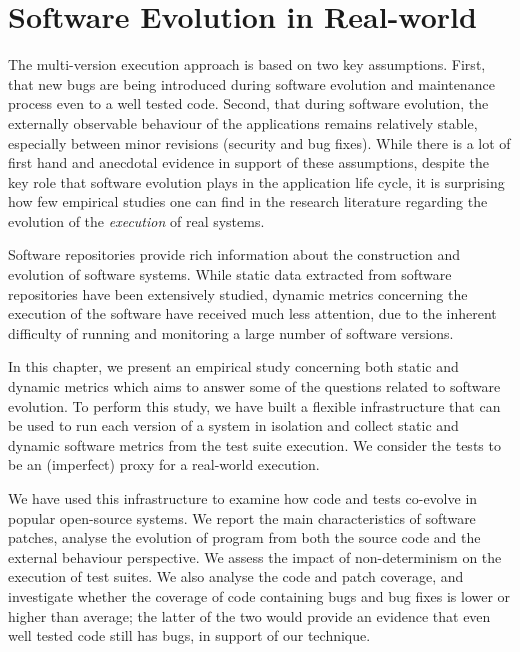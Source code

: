 \chapter{Software Evolution in Real-world}
\label{chap:evolution}

The multi-version execution approach is based on two key assumptions.  First,
that new bugs are being introduced during software evolution and maintenance
process even to a well tested code. Second, that during software evolution,
the externally observable behaviour of the applications remains relatively
stable, especially between minor revisions (\ie security and bug fixes).  While
there is a lot of first hand and anecdotal evidence in support of these
assumptions, despite the key role that software evolution plays in the
application life cycle, it is surprising how few empirical studies one can find
in the research literature regarding the evolution of the \emph{execution} of
real systems.

Software repositories provide rich information about the construction and
evolution of software systems. While static data extracted from software
repositories have been extensively studied, dynamic metrics concerning the
execution of the software have received much less attention, due to the
inherent difficulty of running and monitoring a large number of software
versions.

In this chapter, we present an empirical study concerning both static and
dynamic metrics which aims to answer some of the questions related to software
evolution. To perform this study, we have built a flexible infrastructure that
can be used to run each version of a system in isolation and collect static and
dynamic software metrics from the test suite execution. We consider the tests
to be an (imperfect) proxy for a real-world execution.


We have used this infrastructure to examine how code and tests co-evolve in
\numSystems popular open-source systems. We report the main characteristics of
software patches, analyse the evolution of program from both the source code
and the external behaviour perspective. We assess the impact of non-determinism
on the execution of test suites. We also analyse the code and patch coverage,
and investigate whether the coverage of code containing bugs and bug fixes is
lower or higher than average; the latter of the two would provide an evidence
that even well tested code still has bugs, in support of our technique.

